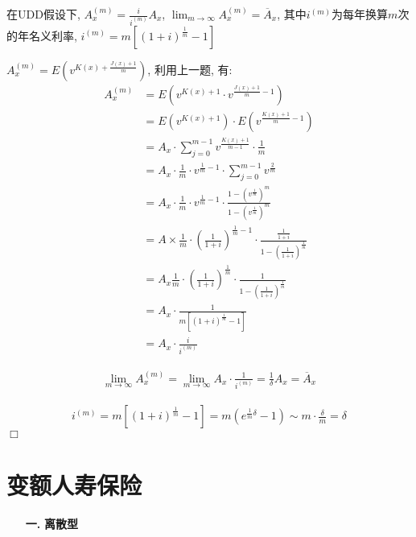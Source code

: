 \documentclass[a4paper,10pt]{ctexbook}
\newcommand{\hei}{\CJKfamily{hei}}      %
\def\qed{\hfill$\Box$\medskip}
\begin{document}
\begin{proposition}
    在UDD假设下, $A_{x}^{(m)}=\frac{i}{i^{(m)}}A_{x}$, $\lim_{m\to\infty}A_{x}^{(m)}=\overline{A}_{x}$, 其中$i^{(m)}$为每年换算$m$次的年名义利率, $i^{(m)}=m[(1+i)^{\frac{1}{m}}-1]$
\end{proposition}

\proof
$A_{x}^{(m)}=E(v^{K(x)+\frac{J(x)+1}{m}})$, 利用上一题, 有: \newline
\begin{align*}
    A_{x}^{(m)} & =E(v^{K(x)+1}\cdot v^{\frac{J(x)+1}{m}-1})                                                                        \\
                & = E(v^{K(x)+1})\cdot E(v^{\frac{K(x)+1}{m}-1})                                                                    \\
                & =A_{x}\cdot\sum_{j=0}^{m-1}v^{\frac{K(x)+1}{m-1}}\cdot\frac{1}{m}                                                 \\
                & =A_{x}\cdot\frac{1}{m}\cdot v^{\frac{1}{m}-1}\cdot\sum_{j=0}^{m-1}v^{\frac{2}{m}}                                 \\
                & =A_{x}\cdot\frac{1}{m}\cdot v^{\frac{1}{m}-1}\cdot\frac{1-(v^{\frac{1}{m}})^{m}}{1-(v^{\frac{1}{m}})^{m}}         \\
                & =A\times\frac{1}{m}\cdot(\frac{1}{1+i})^{\frac{1}{m}-1}\cdot\frac{\frac{1}{1+i}}{1-(\frac{1}{1+i})^{\frac{1}{m}}} \\
                & =A_{x}\frac{1}{m}\cdot(\frac{1}{1+i})^{\frac{1}{m}}\cdot\frac{1}{1-(\frac{1}{1+i})^{\frac{1}{m}}}                 \\
                & =A_{x}\cdot\frac{1}{m[(1+i)^{\frac{1}{m}}-1]}                                                                     \\
                & =A_{x}\cdot\frac{i}{i^{(m)}}
\end{align*}

\begin{align*}
    \lim_{m\to\infty}A_{x}^{(m)}=\lim_{m\to\infty}A_{x}\cdot\frac{1}{i^{(m)}}=\frac{1}{\delta}A_{x}=\overline{A}_{x}
\end{align*}

\begin{align*}
    i^{(m)}=m[(1+i)^{\frac{1}{m}}-1]=m(e^{\frac{1}{m}\delta}-1)\sim m\cdot\frac{\delta}{m}=\delta
\end{align*}
\qed

\section{变额人寿保险}
\begin{itemize}
    \item[{\bf\hei 一.}]{\bf\hei 离散型}
\end{itemize}
\end{document}
